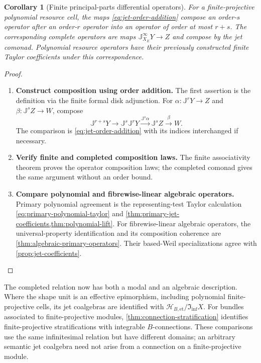\documentclass[11pt,a4paper]{article}
\numberwithin{algorithm}{section}
\numberwithin{equation}{section}
\newtheorem{corollary}[corollary]{Corollary}
\theoremstyle{definition}
\theoremstyle{remark}
\theoremstyle{plain}
\newcommand{\InfShape}{\mathfrak I_{\mathrm{inf}}}
\newcommand{\ThickEt}{\mathscr H_{B,\mathrm{et}}}
\theoremstyle{definition}
\theoremstyle{plain}
\begin{document}
\begin{corollary}[Finite principal-parts differential operators]
\label{cor:finite-differential-operators}
For a finite-projective polynomial resource cell, the maps
\eqref{eq:jet-order-addition} compose an order-$s$ operator after
an order-$r$ operator into an operator of order at most $r+s$.
The corresponding complete operators are maps
$\mathbb J_{X_E}^\infty Y\to Z$ and compose by the jet comonad.
Polynomial resource operators have their previously constructed
finite Taylor coefficients under this correspondence.
\end{corollary}
\begin{proof}\leavevmode
\begin{enumerate}[leftmargin=*,align=left]
\item \textbf{Construct composition using order addition.}
The first assertion is the definition via the finite formal
disk adjunction.  For $\alpha:\mathbb J^rY\to Z$ and
$\beta:\mathbb J^sZ\to W$, compose
\[
 \mathbb J^{r+s}Y\longrightarrow\mathbb J^s\mathbb J^rY
 \xrightarrow{\mathbb J^s\alpha}\mathbb J^sZ
 \xrightarrow{\beta}W.
\]
The comparison is \eqref{eq:jet-order-addition} with its indices
interchanged if necessary.

\item \textbf{Verify finite and completed composition laws.}
The finite associativity theorem
proves the operator composition laws; the completed comonad gives
the same argument without an order bound.

\item \textbf{Compare polynomial and fibrewise-linear algebraic operators.}
Primary polynomial agreement is the representing-test Taylor
calculation \eqref{eq:primary-polynomial-taylor} and
\cref{thm:primary-jet-coefficients,thm:polynomial-lift}.
For fibrewise-linear algebraic operators, the universal-property
identification and its composition coherence are
\cref{thm:algebraic-primary-operators}.  Their based-Weil
specializations agree with \cref{prop:jet-coefficients}.
\end{enumerate}
\end{proof}

The completed relation now has both a modal and an algebraic
description. Where the shape unit is an effective epimorphism,
including polynomial finite-projective cells, its jet coalgebras
are identified with $\ThickEt/\InfShape X$.
For bundles associated to finite-projective modules,
\cref{thm:connection-stratification} identifies finite-projective
stratifications with integrable $B$-connections.
These comparisons use the same infinitesimal relation but
have different domains; an arbitrary semantic jet coalgebra
need not arise from a connection on a finite-projective module.
\end{document}
